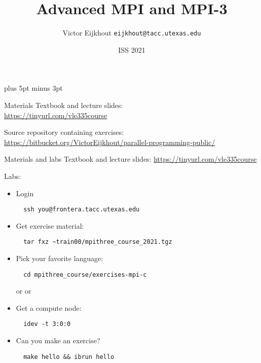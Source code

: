 \documentclass[11pt,headernav]{beamer}
\newcounter{tacc}
\def\Location{}%
\def\courseyear{2021}
\def\Location{TACC APP institute MPI training \courseyear}
\def\Location{TACC/XSEDE MPI training \courseyear}
\def\Location{PEARC2020\\
  \url{http://tinyurl.com/tacc-pearc-2020}\\
  \texttt{\char126 train00/mpithree\_course\_2020.tgz}
}
\def\Location{ISS 2021}
\newcounter{mpithree}
\begin{document}
\parskip=10pt plus 5pt minus 3pt

\title{Advanced MPI and MPI-3}
\author{Victor Eijkhout {\tt eijkhout@tacc.utexas.edu}}
\date{\Location}

\begin{frame}
  \titlepage
\end{frame}

\begin{xsede}
  
\end{xsede}

\begin{download}
  \begin{frame}[containsverbatim]{Materials}
    Textbook and lecture slides:\\
    \url{https://tinyurl.com/vle335course}
    
    Source repository containing exercises: \\
    \url{https://bitbucket.org/VictorEijkhout/parallel-programming-public/}
  \end{frame}
\end{download}

\begin{lab}
  \begin{frame}[containsverbatim]{Materials and labs}
    Textbook and lecture slides: \url{https://tinyurl.com/vle335course}

    Labs:
    \begin{itemize}
    \item Login
\begin{verbatim}
  ssh you@frontera.tacc.utexas.edu
\end{verbatim}

\item Get exercise material:\\
\begin{verbatim}
  tar fxz ~train00/mpithree_course_2021.tgz
\end{verbatim}

\item Pick your favorite language:\\
\begin{verbatim}
  cd mpithree_course/exercises-mpi-c
\end{verbatim}
  or  or 
\item Get a compute node:
\begin{verbatim}
  idev -t 3:0:0
\end{verbatim}

\item Can you make an exercise?\\
\begin{verbatim}
  make hello && ibrun hello
\end{verbatim}

    \end{itemize}
  \end{frame}
\end{lab}
\end{document}
